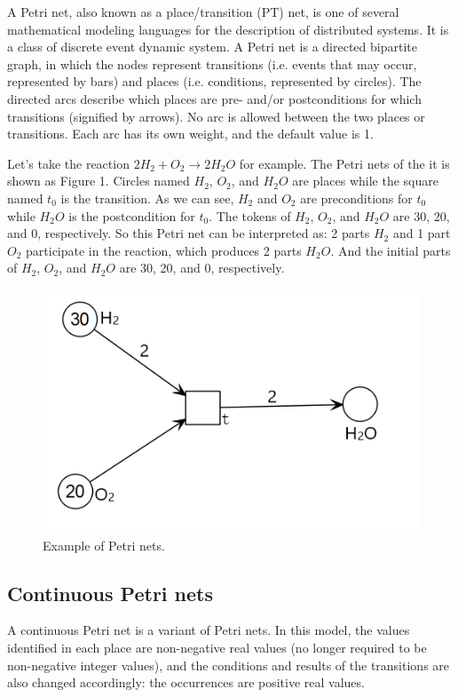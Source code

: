 \documentclass[journal,a4paper,onecolumn]{article}
\newcommand{\comR}[1]{\textcolor{red}{\emph{#1}}}
\newcommand{\comB}[1]{\textcolor{blue}{\emph{#1}}}
\begin{document}
A Petri net, also known as a place/transition (PT) net, is one of several mathematical modeling languages for the description of distributed systems. It is a class of discrete event dynamic system. A Petri net is a directed bipartite graph, in which the nodes represent transitions (i.e. events that may occur, represented by bars) and places (i.e. conditions, represented by circles). The directed arcs describe which places are pre- and/or postconditions for which transitions (signified by arrows). \cite{petrinet} No arc is allowed between the two places or transitions. Each arc has its own weight, and the default value is 1.

Let's take the reaction $2H_2+O_2\to 2H_2O$ for example. The Petri nets of the it is shown as Figure 1. Circles named $H_2$, $O_2$, and $H_2O$ are places while the square named $t_0$ is the transition. As we can see, $H_2$ and $O_2$ are preconditions for $t_0$ while $H_2O$ is the postcondition for $t_0$. The tokens of $H_2$, $O_2$, and $H_2O$ are 30, 20, and 0, respectively. So this Petri net can be interpreted as: 2 parts $H_2$ and 1 part $O_2$ participate in the reaction, which produces 2 parts $H_2O$. And the initial parts of $H_2$, $O_2$, and $H_2O$ are 30, 20, and 0, respectively.
\begin{figure}[!hbt]
	\begin{center}
		\includegraphics[width=0.5\columnwidth]{fig47}
		\caption{Example of Petri nets.}
		\label{fig:Example of Petri nets}
	\end{center}
\end{figure}



\subsection{Continuous Petri nets}

A continuous Petri net is a variant of Petri nets. In this model, the values identified in each place are non-negative real values (no longer required to be non-negative integer values), and the conditions and results of the transitions are also changed accordingly: the occurrences are positive real values.
\end{document}
